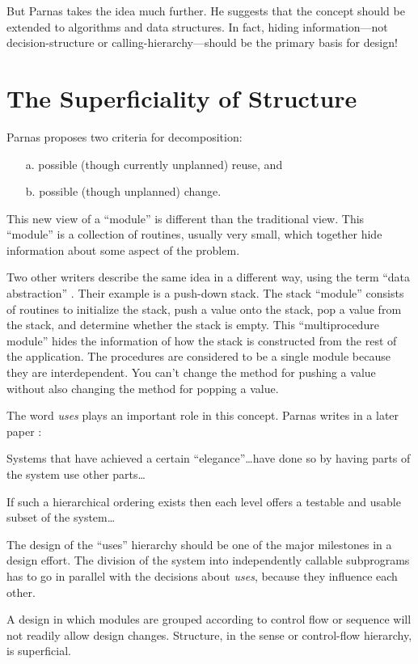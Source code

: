 But Parnas
takes the idea much further. He suggests that the concept should be
extended to algorithms and data structures.  In fact, hiding
information---not decision-structure or calling-hierarchy---should be
the primary basis for design!

\section{The Superficiality of Structure}
Parnas proposes two criteria for decomposition:

\begin{enumerate}
\item[a.] possible (though currently unplanned) reuse, and
\item[b.] possible (though unplanned) change.
\end{enumerate}
This new view of a ``module'' is different than the traditional
view. This ``module'' is a collection of routines, usually very
small, which together hide information about some aspect of the problem. 

Two other writers describe the same idea in a different way, using the
term ``data abstraction'' \cite{liskov75}
.
Their example is a push-down stack. The stack ``module'' consists of
routines to initialize the stack, push a value onto the stack, pop a
value from the stack, and determine whether the stack is empty. This
``multiprocedure module''
hides the information of how the stack is constructed from the rest of
the application. The procedures are considered to be a single module
because they are interdependent. You can't change the method for
pushing a value without also changing the method for popping a value.

The word \emph{uses} plays an important role in this concept.  Parnas
writes in a later paper \cite{parnas79}:

\begin{tfquot}
Systems that have achieved a certain ``elegance''\dots{}have done so
by having parts of the system use other parts\dots{}

If such a hierarchical ordering exists then each level offers a
testable and usable subset of the system\dots{}

The design of the ``uses'' hierarchy should be one of the major
milestones in a design effort. The division of the system into
independently callable subprograms has to go in parallel with the
decisions about \emph{uses}, because they influence each other.
\end{tfquot}
A design in which modules are grouped according to control flow or
sequence will not readily allow design changes. Structure, in the
sense or control-flow hierarchy, is superficial.

